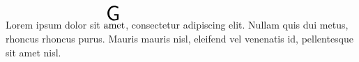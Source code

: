 \documentclass{article}
\begin{document}
Lorem ipsum dolor sit $\overset{ \resizebox{0.5cm}{!}{\textsf{G}} }{\text{amet}}$, consectetur adipiscing elit.
Nullam quis dui metus, rhoncus rhoncus purus. Mauris mauris nisl,
eleifend vel venenatis id, pellentesque sit amet nisl.
\end{document}
